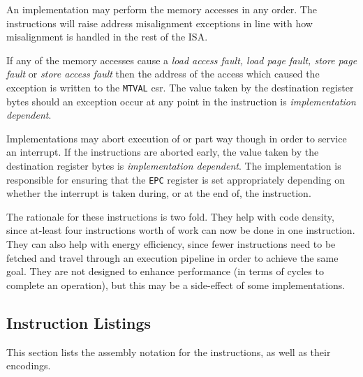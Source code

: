 \bigskip


An implementation may perform the memory accesses in any order. The instructions
will raise address misalignment exceptions in line with how misalignment is
handled in the rest of the ISA.

If any of the memory accesses cause
a {\em load access fault, load page fault, store page fault} or
{\em store access fault} then the address of the access which caused the
exception is written to the {\tt MTVAL} csr. The value taken by the
destination register bytes should an exception occur at any point in the
instruction is {\em implementation dependent}.

Implementations may abort execution of  or  part way
though in order to service an interrupt. If the instructions are aborted
early, the value taken by the destination register bytes is {\em
implementation dependent}. The implementation is responsible for ensuring
that the {\tt EPC} register is set appropriately depending on whether the
interrupt is taken during, or at the end of, the instruction.

The rationale for these instructions is two fold. They help with code density,
since at-least four instructions worth of work can now be done
in one instruction. They can also help with energy efficiency, since fewer
instructions need to be fetched and travel through an execution pipeline in
order to achieve the same goal. They are not designed to enhance performance
(in terms of cycles to complete an operation), but this may be a side-effect
of some implementations.

\newpage
\subsection{Instruction Listings}

This section lists the assembly notation for the instructions, as well as
their encodings.

